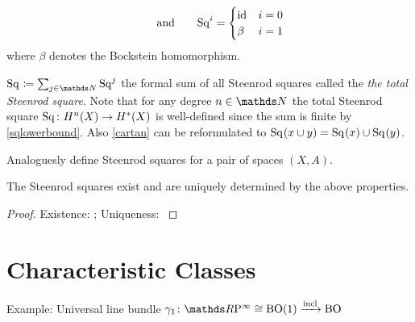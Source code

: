 \begin{Def}
\begin{description}
\begin{gather}
      \qquad\text{and}\qquad
      \mathrm{Sq}^{i} = \begin{cases}
        \mathrm{id}_{} & i=0\\
        \beta & i=1
      \end{cases}
    \end{gather}
     where $\beta$ denotes the Bockstein homomorphism. %
  \end{description}
  $\Sq{}\coloneqq \sum_{j\in\Nat}\Sq j$ the formal sum of all
  Steenrod squares called the \emph{the total Steenrod square}.
  Note that for any degree $n\in\Nat$ the total Steenrod square
  $\mathrm{Sq}^{}\colon H^n(X)\to H^*(X)$ is well-defined since the sum is
  finite by \eqref{sqlowerbound}.
  Also \ref{cartan} can be reformulated to
  $\mathrm{Sq}^{}(x\cup y) = \mathrm{Sq}^{}(x)\cup\mathrm{Sq}^{}(y)$.

  Analoguesly define Steenrod squares for a pair of spaces $(X,A)$.
\end{Def}

\begin{Thm}
  The Steenrod squares exist and are uniquely determined by the above
  properties.
  \begin{proof} %
    Existence: \cite[Chapter 2]{mosher};
    Uniqueness: \cite[VIII §3]{steenrodepstein}
  \end{proof}
\end{Thm}

\section{Characteristic Classes}
\begin{Def} %
  Example: Universal line bundle $\gamma_1\colon \RP\cong\BO(1)\xrightarrow{\incl} \BO$
\end{Def}

